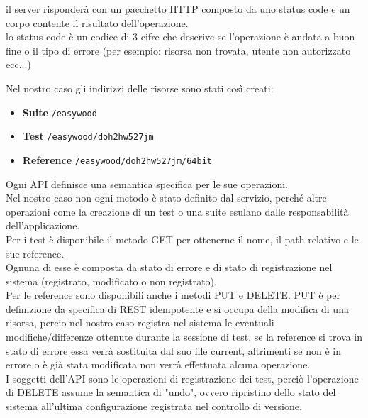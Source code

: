         il server risponderà con un pacchetto HTTP composto da uno status code e un corpo contente il risultato dell'operazione.\\
        lo status code è un codice di 3 cifre che descrive se l'operazione è andata a buon fine o il tipo di errore (per esempio: risorsa non trovata, utente non autorizzato ecc...)
        
        Nel nostro caso gli indirizzi delle risorse sono stati così creati: 
        \begin{itemize}
            \item \textbf{Suite} \verb|/easywood|
            \item \textbf{Test} \verb|/easywood/doh2hw527jm|
            \item \textbf{Reference} \verb|/easywood/doh2hw527jm/64bit|
        \end{itemize}
        
        Ogni API definisce una semantica specifica per le sue operazioni.\\
        Nel nostro caso non ogni metodo è stato definito dal servizio, perché altre operazioni come la creazione di un test o una suite esulano dalle responsabilità dell'applicazione.\\
        
        Per i test è disponibile il metodo GET per  ottenerne il nome, il path relativo e le sue reference.\\
        Ognuna di esse è composta da stato di errore e di stato di registrazione nel sistema (registrato, modificato o non registrato).\\
        Per le reference sono disponibili anche i metodi PUT e DELETE. PUT è per definizione da specifica di REST idempotente e si occupa della modifica di una risorsa, percio nel nostro caso registra nel sistema le eventuali modifiche/differenze ottenute durante la sessione di test, se la reference si trova in stato di errore essa verrà sostituita dal suo file current, altrimenti se non è in errore o è già stata modificata non verrà effettuata alcuna operazione.\\
        
        I soggetti dell'API sono le operazioni di registrazione dei test, perciò l'operazione di DELETE assume la semantica di "undo", ovvero ripristino dello stato del sistema all'ultima configurazione registrata nel controllo di versione.\\
        